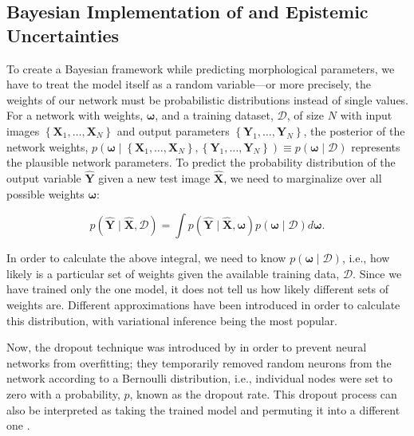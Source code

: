\subsection{Bayesian Implementation of \gampen{} and Epistemic Uncertainties} \label{subsec_c2:mcd}
To create a Bayesian framework while predicting morphological parameters, we have to treat the model itself as a random variable---or more precisely, the weights of our network %
must be probabilistic distributions instead of single
values. For a network with weights, $\boldsymbol{\omega}$, and a training dataset, $\mathcal{D}$, of size $N$ with input images $\left\{\boldsymbol{X}_{1}, \ldots, \boldsymbol{X}_{N}\right\}$ and output parameters $\left\{\boldsymbol{Y}_{1}, \ldots, \boldsymbol{Y}_{N}\right\}$, the posterior of the network weights, $p(\boldsymbol{\omega} \mid \left\{\boldsymbol{X}_{1}, \ldots, \boldsymbol{X}_{N}\right\}, \left\{\boldsymbol{Y}_{1}, \ldots, \boldsymbol{Y}_{N}\right\}) \equiv p(\boldsymbol{\omega} \mid \mathcal{D}) $ represents the plausible network parameters. To predict the probability distribution of the output variable $\boldsymbol{\hat{Y}}$ given a new test image $\boldsymbol{\hat{X}}$, we need to marginalize over all possible weights $\boldsymbol{\omega}$:

\begin{equation}
p(\boldsymbol{\hat{Y}} \mid \boldsymbol{\hat{X}}, \mathcal{D})=\int p(\boldsymbol{\hat{Y}} \mid \boldsymbol{\hat{X}}, \boldsymbol{\omega}) p(\boldsymbol{\omega} \mid \mathcal{D}) d \boldsymbol{\omega} .
\label{eq_c2:out_y_pred}
\end{equation}

In order to calculate the above integral, we need to know $p(\boldsymbol{\omega}\mid\mathcal{D})$, i.e., how likely is a particular set of weights given the available training data, $\mathcal{D}$. Since we have trained only the one model, it does not tell us how likely different sets of weights are. Different approximations have been introduced in order to calculate this distribution, with variational inference \citep{Jordan1999IntroductionModels} being the most popular.

Now, the dropout technique was introduced by \cite{Srivastava2014Dropout:Overfitting} in order to prevent neural networks from overfitting; they temporarily removed random neurons from the network according to a Bernoulli distribution, i.e., individual nodes were set to zero with a probability, $p$, known as the dropout rate. This dropout process can also be interpreted as taking the trained model and permuting it into a different one \citep{Srivastava2014Dropout:Overfitting}.

